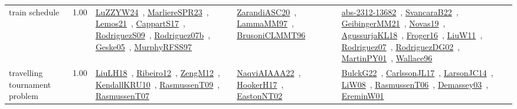 {\begin{longtable}{p{3cm}r>{\raggedright\arraybackslash}p{6cm}>{\raggedright\arraybackslash}p{6cm}>{\raggedright\arraybackslash}p{8cm}}
\index{train schedule}\index{ApplicationAreas!train schedule}train schedule &  1.00 & \href{../works/LuZZYW24.pdf}{LuZZYW24}~\cite{LuZZYW24}, \href{../works/MarliereSPR23.pdf}{MarliereSPR23}~\cite{MarliereSPR23}, \href{../works/Lemos21.pdf}{Lemos21}~\cite{Lemos21}, \href{../works/CappartS17.pdf}{CappartS17}~\cite{CappartS17}, \href{../works/RodriguezS09.pdf}{RodriguezS09}~\cite{RodriguezS09}, \href{../works/Rodriguez07b.pdf}{Rodriguez07b}~\cite{Rodriguez07b}, \href{../works/Geske05.pdf}{Geske05}~\cite{Geske05}, \href{../works/MurphyRFSS97.pdf}{MurphyRFSS97}~\cite{MurphyRFSS97} & \href{../works/ZarandiASC20.pdf}{ZarandiASC20}~\cite{ZarandiASC20}, \href{../works/LammaMM97.pdf}{LammaMM97}~\cite{LammaMM97}, \href{../works/BrusoniCLMMT96.pdf}{BrusoniCLMMT96}~\cite{BrusoniCLMMT96} & \href{../works/abs-2312-13682.pdf}{abs-2312-13682}~\cite{abs-2312-13682}, \href{../works/SvancaraB22.pdf}{SvancaraB22}~\cite{SvancaraB22}, \href{../works/GeibingerMM21.pdf}{GeibingerMM21}~\cite{GeibingerMM21}, \href{../works/Novas19.pdf}{Novas19}~\cite{Novas19}, \href{../works/AgussurjaKL18.pdf}{AgussurjaKL18}~\cite{AgussurjaKL18}, \href{../works/Froger16.pdf}{Froger16}~\cite{Froger16}, \href{../works/LiuW11.pdf}{LiuW11}~\cite{LiuW11}, \href{../works/Rodriguez07.pdf}{Rodriguez07}~\cite{Rodriguez07}, \href{../works/RodriguezDG02.pdf}{RodriguezDG02}~\cite{RodriguezDG02}, \href{../works/MartinPY01.pdf}{MartinPY01}~\cite{MartinPY01}, \href{../works/Wallace96.pdf}{Wallace96}~\cite{Wallace96}\\
\index{travelling tournament problem}\index{ApplicationAreas!travelling tournament problem}travelling tournament problem &  1.00 & \href{../works/LiuLH18.pdf}{LiuLH18}~\cite{LiuLH18}, \href{../works/Ribeiro12.pdf}{Ribeiro12}~\cite{Ribeiro12}, \href{../works/ZengM12.pdf}{ZengM12}~\cite{ZengM12}, \href{../works/KendallKRU10.pdf}{KendallKRU10}~\cite{KendallKRU10}, \href{../works/RasmussenT09.pdf}{RasmussenT09}~\cite{RasmussenT09}, \href{../works/RasmussenT07.pdf}{RasmussenT07}~\cite{RasmussenT07} & \href{../works/NaqviAIAAA22.pdf}{NaqviAIAAA22}~\cite{NaqviAIAAA22}, \href{../works/HookerH17.pdf}{HookerH17}~\cite{HookerH17}, \href{../works/EastonNT02.pdf}{EastonNT02}~\cite{EastonNT02} & \href{../works/BulckG22.pdf}{BulckG22}~\cite{BulckG22}, \href{../works/CarlssonJL17.pdf}{CarlssonJL17}~\cite{CarlssonJL17}, \href{../works/LarsonJC14.pdf}{LarsonJC14}~\cite{LarsonJC14}, \href{../works/LiW08.pdf}{LiW08}~\cite{LiW08}, \href{../works/RasmussenT06.pdf}{RasmussenT06}~\cite{RasmussenT06}, \href{../works/Demassey03.pdf}{Demassey03}~\cite{Demassey03}, \href{../works/EreminW01.pdf}{EreminW01}~\cite{EreminW01}\\

\end{longtable}}

